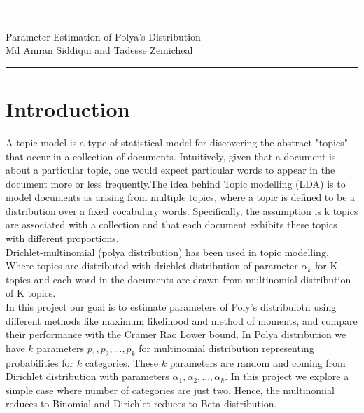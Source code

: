 \documentclass{article} %
\newcommand{\?}{\stackrel{?}{=}}
\newcommand{\horrule}[1]{\rule{\linewidth}{#1}} %
\begin{document}
\begin{center}
\horrule{0.5pt} \\[0.4cm] %
\LARGE Parameter Estimation of Polya's Distribution\\
\vspace{5pt}
\large Md Amran Siddiqui \normalsize and \large Tadesse Zemicheal\\
\vspace{5pt}
\horrule{2pt} %
\end{center}



\section{Introduction} \label{INTRO}
A topic model is a type of statistical model for discovering the abstract "topics" that occur in a collection of documents. Intuitively, given that a document is about a particular topic, one would expect particular words to appear in the document more or less frequently.The idea behind Topic modelling (LDA) is to model documents as arising from multiple topics, where a topic is defined to be a distribution over a fixed vocabulary words. Specifically, the assumption is k topics are associated with a collection and that each document exhibits these topics with different proportions.\\
Drichlet-multinomial (polya distribution) has been used in topic modelling. Where topics are distributed with drichlet distribution of parameter $\alpha_k$ for K topics and each word in the documents are drawn from multinomial distribution of K topics.\\
In this project our goal is to estimate parameters of Poly's distribuiotn using different methods like maximum likelihood and method of moments, and compare their performance with the Cramer Rao Lower bound. In Polya distribution we have $k$ parameters $p_1, p_2, ..., p_k$ for multinomial distribution representing probabilities for $k$ categories. These $k$ parameters are random and coming from Dirichlet distribution with parameters $\alpha_1, \alpha_2, ..., \alpha_k$. In this project we explore a simple case where number of categories are just two. Hence, the multinomial reduces to Binomial and Dirichlet reduces to Beta distribution.
\end{document}
